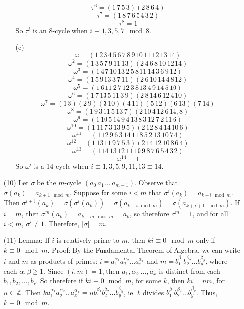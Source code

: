 \documentclass[12pt]{article}
\begin{document}
\begin{itemize}
\begin{itemize}
$$\tau^6 = (1 \, 7 \, 5 \, 3)(2 \, 8 \, 6 \, 4)$$
$$\tau^7 = (1 \, 8 \, 7 \, 6 \, 5 \, 4 \, 3 \, 2)$$
$$\tau^8 = 1$$
So $\tau^i$ is an 8-cycle when $i \equiv 1, 3, 5, 7 \mod 8$.
\item[(c)]
$$\omega = (1 \, 2 \, 3 \, 4 \, 5 \, 6 \, 7 \, 8 \, 9 \, 10 \, 11 \, 12 \, 13 \, 14)$$
$$\omega^2 = (1 \, 3 \, 5 \, 7 \, 9 \, 11 \, 13)(2 \, 4 \, 6 \, 8 \, 10 \, 12 \, 14)$$
$$\omega^3 = (1 \, 4 \, 7 \, 10 \, 13 \, 2 \, 5 \, 8 \, 11 \, 14 \, 3 \, 6 \, 9 \, 12)$$
$$\omega^4 = (1 \, 5 \, 9 \, 13 \, 3 \, 7 \, 11)(2 \, 6 \, 10 \, 14 \, 4 \, 8 \, 12)$$
$$\omega^5 = (1 \, 6 \, 11 \, 2 \, 7 \, 12 \, 3 \, 8 \, 13 \, 4 \, 9 \, 14 \, 5 \, 10)$$
$$\omega^6 = (1 \, 7 \, 13 \, 5 \, 11 \, 3 \, 9)(2 \, 8 \, 14 \, 6 \, 12 \, 4 \, 10)$$
$$\omega^7 = (1 \, 8)(2 \, 9)(3 \, 10)(4 \, 11)(5 \, 12)(6 \, 13)(7 \, 14)$$
$$\omega^8 = (1 \, 9 \, 3 \, 11 \, 5 \, 13 \, 7)(2 \, 10 \, 4 \, 12 \, 6 \, 14 , 8)$$
$$\omega^9 = (1 \, 10 \, 5 \, 14 \, 9 \, 4 \, 13 \, 8 \, 3 \, 12 \, 7 \, 2 \, 11 \, 6)$$
$$\omega^{10} = (1 \, 11 \, 7 \, 3 \, 13 \, 9 \, 5)(2 \, 12 \, 8 \, 4 \, 14 \, 10 \, 6)$$
$$\omega^{11} = (1 \, 12 \, 9 \, 6 \, 3 \, 14 \, 11 \, 8 \, 5 \, 2 \, 13 \, 10 \, 7 \, 4)$$
$$\omega^{12} = (1 \, 13 \, 11 \, 9 \, 7 \, 5 \, 3)(2 \, 14 \, 12 \, 10 \, 8 \, 6 \, 4)$$
$$\omega^{13} = (1 \, 14 \, 13 \, 12 \, 11 \, 10 \, 9 \, 8 \, 7 \, 6 \, 5 \, 4 \, 3 \, 2)$$
$$\omega^{14} = 1$$
So $\omega^i$ is a 14-cycle when $i \equiv 1, 3, 5, 9, 11, 13 \equiv 14$.
\end{itemize}
\item[(10)]
Let $\sigma$ be the $m$-cycle $(a_0 \, a_1 \, ... \, a_{m - 1})$. Observe that
$\sigma(a_k) = a_{k + 1 \mod m}$. Suppose for some $i < m$ that $\sigma^i(a_k) = a_{k + i \mod m}$. Then $\sigma^{i+1}(a_k) = \sigma(\sigma^i(a_k)) = \sigma(a_{k + i \mod m}) = \sigma(a_{k + i + 1 \mod m})$. If $i = m$, then $\sigma^m(a_k) = a_{k + m \mod m} = a_k$, so therefore $\sigma^m = 1$, and for all $i < m$, $\sigma^i \neq 1$. Therefore, $|\sigma| = m$.
\item[(11)]
Lemma: If $i$ is relatively prime to $m$, then $ki \equiv 0 \mod m$ only if $k \equiv 0 \mod m$. Proof: By the Fundamental Theorem of Algebra, we can write $i$ and $m$ as products of primes: $i = a_1^{\alpha_1}a_2^{\alpha_2}...a_x^{\alpha_x}$ and $m = b_1^{\beta_1}b_2^{\beta_2}...b_y^{\beta_y}$, where each $\alpha, \beta \geq 1$. Since $(i, m) = 1$, then $a_1, a_2, ..., a_x$ is distinct from each $b_1, b_2, ..., b_y$. So therefore if $ki \equiv 0 \mod m$, for some $k$, then $ki = nm$, for $n \in \mathbb{Z}$. Then $ka_1^{\alpha_1}a_2^{\alpha_2}...a_x^{\alpha_x} = nb_1^{\beta_1}b_2^{\beta_2}...b_y^{\beta_y}$, ie. $k$ divides $b_1^{\beta_1}b_2^{\beta_2}...b_y^{\beta_y}$. Thus, $k \equiv 0 \mod m$. 


\end{itemize}
\end{document}

